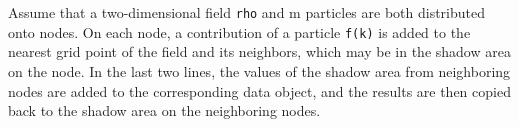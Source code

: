 Assume that a two-dimensional field {\tt rho} and m particles are
both distributed onto nodes. On each node, a contribution of a particle
{\tt f(k)} is added to the nearest grid point of the field and its
neighbors, which may be in the shadow area on the node. In the last two
lines, the values of the shadow area from neighboring nodes are added to
the corresponding data object, and the results are then copied back to
the shadow area on the neighboring nodes.
